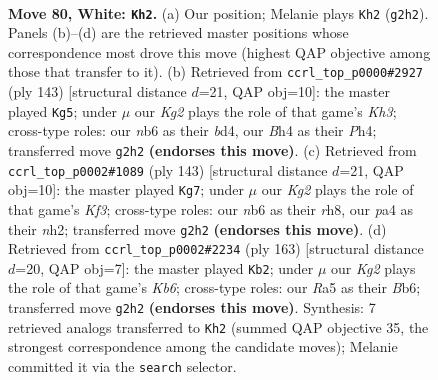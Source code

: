 \documentclass[11pt]{article}
\begin{document}
\clearpage

\begin{figure}[p]\centering
\begin{subfigure}{0.46\textwidth}\centering
\resizebox{\linewidth}{!}{%
\newchessgame
\chessboard[
  setfen={6k1/8/1n1r4/R7/p4P1B/P6P/6K1/8 w - - 15 80},
  showmover=false,
  pgfstyle=straightmove, color=movearrow, markmove={g2-h2}
]}
\caption{}
\end{subfigure}\hfill
\begin{subfigure}{0.46\textwidth}\centering
\resizebox{\linewidth}{!}{%
\newchessgame
\chessboard[
  setfen={r7/8/PK4pk/3p4/3B3p/8/4N3/8 b - - 1 72},
  showmover=false,
  pgfstyle=straightmove, color=movearrow, markmove={h6-g5}
]}
\caption{}
\end{subfigure}
\\[4pt]
\begin{subfigure}{0.46\textwidth}\centering
\resizebox{\linewidth}{!}{%
\newchessgame
\chessboard[
  setfen={7R/8/5k2/5pp1/3P4/4K3/r6N/8 b - - 6 72},
  showmover=false,
  pgfstyle=straightmove, color=movearrow, markmove={f6-g7}
]}
\caption{}
\end{subfigure}\hfill
\begin{subfigure}{0.46\textwidth}\centering
\resizebox{\linewidth}{!}{%
\newchessgame
\chessboard[
  setfen={8/8/1b4K1/8/4N3/1k6/p4P2/4R3 b - - 1 82},
  showmover=false,
  pgfstyle=straightmove, color=movearrow, markmove={b3-b2}
]}
\caption{}
\end{subfigure}
\caption{\textbf{Move 80, White: \texttt{Kh2}.} (a) Our position; Melanie plays \texttt{Kh2} (\texttt{g2h2}). Panels (b)--(d) are the retrieved master positions whose correspondence most drove this move (highest QAP objective among those that transfer to it). (b) Retrieved from \texttt{ccrl\_top\_p0000\#2927} (ply 143) [structural distance $d$=21, QAP obj=10]: the master played \texttt{Kg5}; under $\mu$ our \emph{Kg2} plays the role of that game's \emph{Kh3}; cross-type roles: our \emph{n}b6 as their \emph{b}d4, our \emph{B}h4 as their \emph{P}h4; transferred move \texttt{g2h2} \textbf{(endorses this move)}. (c) Retrieved from \texttt{ccrl\_top\_p0002\#1089} (ply 143) [structural distance $d$=21, QAP obj=10]: the master played \texttt{Kg7}; under $\mu$ our \emph{Kg2} plays the role of that game's \emph{Kf3}; cross-type roles: our \emph{n}b6 as their \emph{r}h8, our \emph{p}a4 as their \emph{n}h2; transferred move \texttt{g2h2} \textbf{(endorses this move)}. (d) Retrieved from \texttt{ccrl\_top\_p0002\#2234} (ply 163) [structural distance $d$=20, QAP obj=7]: the master played \texttt{Kb2}; under $\mu$ our \emph{Kg2} plays the role of that game's \emph{Kb6}; cross-type roles: our \emph{R}a5 as their \emph{B}b6; transferred move \texttt{g2h2} \textbf{(endorses this move)}. Synthesis: 7 retrieved analogs transferred to \texttt{Kh2} (summed QAP objective 35, the strongest correspondence among the candidate moves); Melanie committed it via the \texttt{search} selector.}
\label{fig:thought-m158}
\end{figure}
\end{document}
